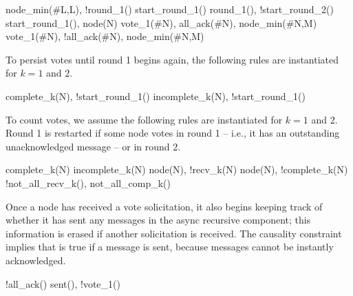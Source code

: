 \begin{Drules}
      {node_min(#L,L), !round_1()}
      {start_round_1()}
      {round_1(), !start_round_2()}
      {start_round_1(), node(N)}
      {vote_1(#N), all_ack(#N), node_min(#N,M)}
      {vote_1(#N), !all_ack(#N), node_min(#N,M)}
\end{Drules}

To persist votes until round 1 begins again, the following rules are instantiated for $k=1$ and $2$.

\begin{Drules}
      {complete_k(N), !start_round_1()}
      {incomplete_k(N), !start_round_1()}
\end{Drules}

To count votes, we assume the following rules are instantiated for $k=1$ and $2$.  Round 1 is restarted if some node votes  in round 1 -- i.e., it has an outstanding unacknowledged message -- or  in round 2.

\begin{Drules}
      {complete_k(N)}
      {incomplete_k(N)}
      {node(N), !recv_k(N)}
      {node(N), !complete_k(N)}
      {!not_all_recv_k(), not_all_comp_k()}
\end{Drules}

Once a node has received a  vote solicitation, it also begins keeping track of whether it has sent any messages in the async recursive component; this information is erased if another  solicitation is received.  The causality constraint implies that  is true if a message is sent, because messages cannot be instantly acknowledged.

\begin{Drules}
      {!all_ack()}
      {sent(), !vote_1()}
\end{Drules}


